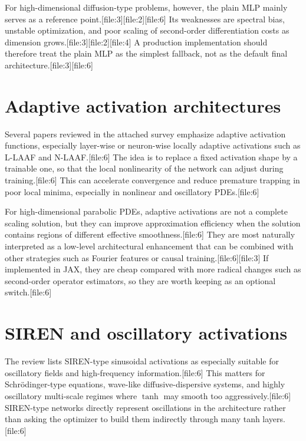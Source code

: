 \documentclass[11pt]{report}
\begin{document}
For high-dimensional diffusion-type problems, however, the plain MLP mainly serves as a reference point.[file:3][file:2][file:6]  
Its weaknesses are spectral bias, unstable optimization, and poor scaling of second-order differentiation costs as dimension grows.[file:3][file:2][file:4]  
A production implementation should therefore treat the plain MLP as the simplest fallback, not as the default final architecture.[file:3][file:6]

\section{Adaptive activation architectures}

Several papers reviewed in the attached survey emphasize adaptive activation functions, especially layer-wise or neuron-wise locally adaptive activations such as L-LAAF and N-LAAF.[file:6]  
The idea is to replace a fixed activation shape by a trainable one, so that the local nonlinearity of the network can adjust during training.[file:6]  
This can accelerate convergence and reduce premature trapping in poor local minima, especially in nonlinear and oscillatory PDEs.[file:6]

For high-dimensional parabolic PDEs, adaptive activations are not a complete scaling solution, but they can improve approximation efficiency when the solution contains regions of different effective smoothness.[file:6]  
They are most naturally interpreted as a low-level architectural enhancement that can be combined with other strategies such as Fourier features or causal training.[file:6][file:3]  
If implemented in JAX, they are cheap compared with more radical changes such as second-order operator estimators, so they are worth keeping as an optional switch.[file:6]

\section{SIREN and oscillatory activations}

The review lists SIREN-type sinusoidal activations as especially suitable for oscillatory fields and high-frequency information.[file:6]  
This matters for Schr\"odinger-type equations, wave-like diffusive-dispersive systems, and highly oscillatory multi-scale regimes where \(\tanh\) may smooth too aggressively.[file:6]  
SIREN-type networks directly represent oscillations in the architecture rather than asking the optimizer to build them indirectly through many tanh layers.[file:6]
\end{document}
